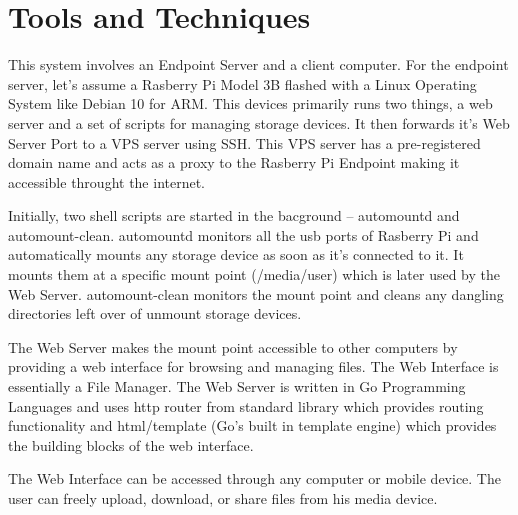 \documentclass[12pt]{article}
\begin{document}
\section{Tools and Techniques}
\vspace{2cm}
\quad\quad
This system involves an Endpoint Server and a client computer. For the endpoint server, let's assume a Rasberry Pi Model 3B flashed with a Linux Operating System like Debian 10 for ARM. This devices primarily runs two things, a web server and a set of scripts for managing storage devices. It then forwards it's Web Server Port to a VPS server using SSH. This VPS server has a pre-registered domain name and acts as a proxy to the Rasberry Pi Endpoint making it accessible throught the internet. \\
\par
Initially, two shell scripts are started in the bacground -- automountd and automount-clean. automountd monitors all the usb ports of Rasberry Pi and automatically mounts any storage device as soon as it's connected to it. It mounts them at a specific mount point (/media/user) which is later used by the Web Server. automount-clean monitors the mount point and cleans any dangling directories left over of unmount storage devices. \\
\par
The Web Server makes the mount point accessible to other computers by providing a web interface for browsing and managing files. The Web Interface is essentially a File Manager. The Web Server is written in Go Programming Languages and uses http router from standard library which provides routing functionality and html/template (Go's built in template engine) which provides the building blocks of the web interface.\\
\par
The Web Interface can be accessed through any computer or mobile device. The user can freely upload, download, or share files from his media device.
\end{document}

